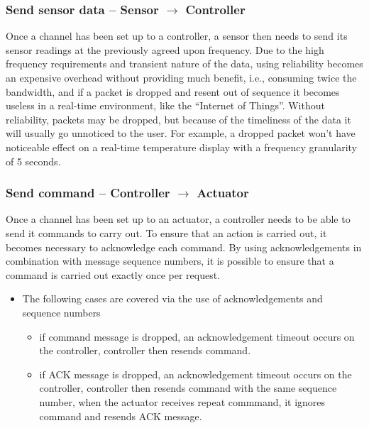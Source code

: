 \subsubsection{Send sensor data -- Sensor $\rightarrow$ Controller} %
\label{ssub:send_sensor_data}
Once a channel has been set up to a controller, a sensor then needs to send its sensor readings at the previously agreed upon frequency. 
Due to the high frequency requirements and transient nature of the data, using reliability becomes an expensive overhead without providing much benefit, i.e., consuming twice the bandwidth, and if a packet is dropped and resent out of sequence it becomes useless in a real-time environment, like the ``Internet of Things''.  
Without reliability, packets may be dropped, but because of the timeliness of the data it will usually go unnoticed to the user. For example, a dropped packet won't have noticeable effect on a real-time temperature display with a frequency granularity of 5 seconds.

\subsubsection{Send command -- Controller $\rightarrow$ Actuator} %
\label{ssub:send_command}
Once a channel has been set up to an actuator, a controller needs to be able to send it commands to carry out. To ensure that an action is carried out, it becomes necessary to acknowledge each command. By using acknowledgements in combination with message sequence numbers, it is possible to ensure that a command is carried out exactly once per request.

\begin{itemize}
	\item The following cases are covered via the use of acknowledgements and sequence numbers
	\begin{itemize}
		\item if command message is dropped, an acknowledgement timeout occurs on the controller, controller then resends command.
		\item if ACK message is dropped, an acknowledgement timeout occurs on the controller, controller then resends command with the same sequence number, when the actuator receives repeat commmand, it ignores command and resends ACK message.
	\end{itemize}
\end{itemize}


